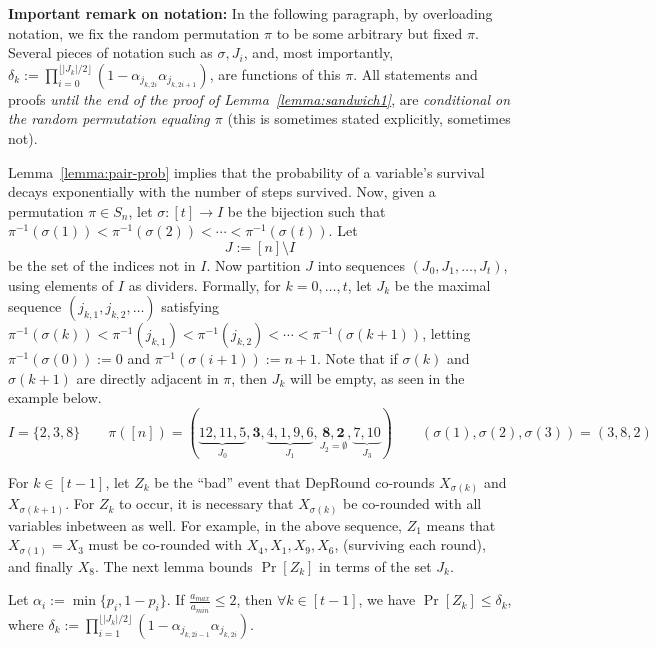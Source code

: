 \smallskip \noindent \textbf{Important remark on notation:} In the following paragraph, by overloading notation, we fix the random permutation $\pi$ to be some arbitrary but fixed $\pi$. Several pieces of notation such as $\sigma, J_i$, and, most importantly, 
$\delta_k:=\prod_{i=0}^{\lfloor |J_k|/2\rfloor}(1-\alpha_{j_{k,2i}}\alpha_{j_{k,2i+1}})$, are functions of this $\pi$. All statements and proofs \emph{until the end of the proof of Lemma~\ref{lemma:sandwich1}}, are \emph{conditional on the random permutation equaling $\pi$} (this is sometimes stated explicitly, sometimes not). 

\smallskip
Lemma~\ref{lemma:pair-prob} implies that the probability of a variable's survival decays exponentially with the number of steps survived. Now, given a permutation $\pi\in S_n$, let $\sigma:[t]\to I$ be the bijection such that $\pi^{-1}(\sigma(1))<\pi^{-1}(\sigma(2))<\cdots<\pi^{-1}(\sigma(t))$. 
Let 
\[ J:=[n]\setminus I \] 
be the set of the indices not in $I$. Now partition $J$ into sequences $(J_0,J_1,\ldots,J_t)$, using elements of $I$ as dividers. Formally, for $k=0,\ldots,t$, let $J_k$ be the maximal sequence $(j_{k,1},j_{k,2},\ldots)$ satisfying $\pi^{-1}(\sigma(k))<\pi^{-1}(j_{k,1})<\pi^{-1}(j_{k,2})<\cdots<\pi^{-1}(\sigma(k+1))$, letting $\pi^{-1}(\sigma(0)):=0$ and $\pi^{-1}(\sigma(i+1)):=n+1$. Note that if $\sigma(k)$ and $\sigma(k+1)$ are directly adjacent in $\pi$, then $J_k$ will be empty, as seen in the example below. 
\[ I=\{2,3,8\}
\qquad\pi([n])=(\underbrace{12,11,5}_{J_0},\mathbf{3},\underbrace{4,1,9,6}_{J_1},\underset{J_2=\emptyset}{\mathbf{8},\mathbf{2}},\underbrace{7,10}_{J_3})
 \qquad  (\sigma(1),\sigma(2),\sigma(3))=(3,8,2)
\]

For $k\in[t-1]$, let $Z_k$ be the ``bad'' event that {\sc DepRound} co-rounds $X_{\sigma(k)}$ and $X_{\sigma(k+1)}$. For $Z_k$ to occur, it is necessary that $X_{\sigma(k)}$ be co-rounded with all variables inbetween as well. For example, in the above sequence, $Z_1$ means that $X_{\sigma(1)}=X_3$ must be co-rounded with $X_4, X_1, X_9, X_6$, (surviving each round), and finally $X_8$. The next lemma bounds $\Pr[Z_k]$ in terms of the set $J_k$.

\begin{lemma}\label{lemma:zbound}
Let $\alpha_i:=\min\{p_i,1-p_i\}$. If $\frac{a_{max}}{a_{min}}\le 2$, then $\forall k\in[t-1]$, we have $\Pr[Z_k]\le \delta_k$, where $\delta_k:=\prod_{i=1}^{\lfloor |J_k|/2\rfloor}(1-\alpha_{j_{k,2i-1}}\alpha_{j_{k,2i}})$.
\end{lemma}


